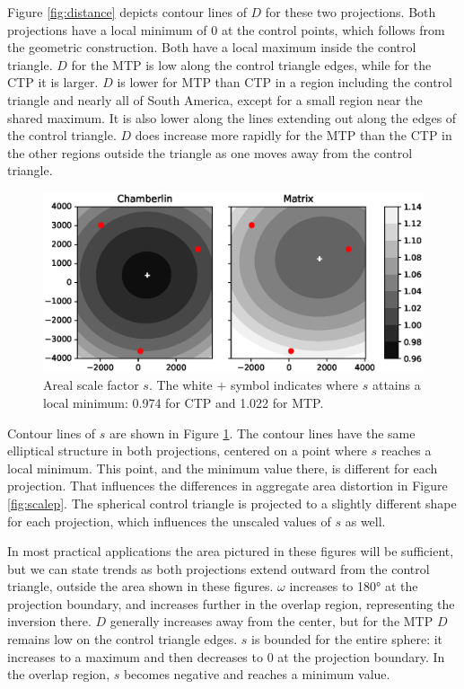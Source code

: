 \documentclass[]{interact}
\begin{document}
Figure \ref{fig:distance} depicts contour lines of $D$ for these two
projections. Both projections have a local minimum of 0 at the control points,
which follows from the geometric construction. Both have a local maximum inside
the control triangle. $D$ for the MTP is low along the control triangle edges,
while for the CTP it is larger. $D$ is lower for MTP than CTP in a region
including the control triangle and nearly all of South America, except for a
small region near the shared maximum. It is also lower along the lines extending
out along the edges of the control triangle. $D$ does increase more rapidly for
the MTP than the CTP in the other regions outside the triangle as one moves away
from the control triangle.

\begin{figure}
  \includegraphics[width=\textwidth]{South_America_Wall_Map_scale}
  \caption{Areal scale factor $s$. The white $+$ symbol indicates where
  $s$ attains a local minimum: 0.974 for CTP and 1.022 for MTP.}
  \label{fig:scale}
\end{figure}

Contour lines of $s$ are shown in Figure \ref{fig:scale}.
The contour lines have the same elliptical structure in both projections,
centered on a point where $s$ reaches a local minimum. This point, and the
minimum value there, is different for each projection. That influences the
differences in aggregate area distortion in Figure \ref{fig:scalep}. The
spherical control triangle is projected to a slightly different shape for each
projection, which influences the unscaled values of $s$ as well.

In most practical applications the area pictured in these figures will be
sufficient, but we can state trends as both projections extend outward from the
control triangle, outside the area shown in these figures. $\omega$ increases to
180° at the projection boundary, and increases further in the overlap region,
representing the inversion there. $D$ generally increases away from the center,
but for the MTP $D$ remains low on the control triangle edges.
$s$ is bounded for the entire sphere:
it increases to a maximum and then decreases to 0 at the projection boundary.
In the overlap region, $s$ becomes negative and reaches a minimum value.
\end{document}
